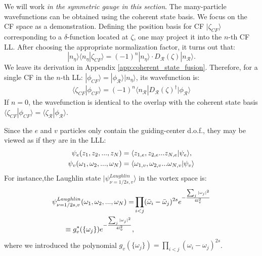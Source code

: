 We will work \emph{in the symmetric gauge in this section}. The many-particle wavefunctions can be obtained using the coherent state basis. We focus on the CF space as a demonstration.
Defining the position basis for CF $|\zeta_{CF}\rangle$ corresponding to a $\delta$-function located at $\zeta$, one may project it into the $n$-th CF LL. After choosing the appropriate normalization factor, it turns out that:
\begin{equation}\label{eq:coherent state projected to LLL}
    |n_{\eta}\rangle\langle n_{\eta}|\zeta_{CF}\rangle=(-1)^n |n_{\eta}\rangle \cdot D_{\mathcal R}(\zeta)|n_{\mathcal R}\rangle.
\end{equation}
We leave its derivation in Appendix \ref{app:coherent_state_fusion}.
Therefore, for a single CF in the $n$-th LL: $|\phi_{CF}\rangle=|\phi_{\mathcal R}\rangle|n_{\eta}\rangle$, its wavefunction is:
\begin{align}
    \langle \zeta_{CF} |\phi_{CF}\rangle=(-1)^n \langle n_{\mathcal R}|D_{\mathcal R}(\zeta)^\dagger|\phi_{\mathcal R}\rangle
\end{align}
If $n=0$, the wavefunction is identical to the overlap with the coherent state basis $\langle \zeta_{CF} |\phi_{CF}\rangle=\langle \zeta_{\mathcal R}|\phi_{\mathcal R}\rangle$.

Since the $e$ and $v$ particles only contain the guiding-center d.o.f., they may be viewed as if they are in the LLL:
\begin{align}
    \psi_e(z_1,z_2,...,z_N)                & =\langle z_{1,e},z_{2,e}... z_{N,e}|\psi_e\rangle,\notag         \\
    \psi_v(\omega_1,\omega_2,...,\omega_N) & =\langle \omega_{1,v},\omega_{2,v}... \omega_{N,v}|\psi_v\rangle
\end{align}
For instance,the Laughlin state $|\psi^{Laughlin}_{\nu=1/2s,v}\rangle$ in the vortex space is:
\begin{align}
    \psi^{Laughlin}_{\nu=1/2s,v}(\omega_1,\omega_2,...,\omega_N)= & \prod_{i<j} (\bar\omega_i-\bar\omega_j)^{2s}  e^{-\frac{\sum_j|\omega_j|^2}{4l_v^2}}\notag \\
    \equiv g_v^*(\{\omega_j\}) e^{-\frac{\sum_j|\omega_j|^2}{4l_v^2}},
\end{align}
where we introduced the polynomial $g_v(\{\omega_j\})=\prod_{i<j} (\omega_i-\omega_j)^{2s}$.


